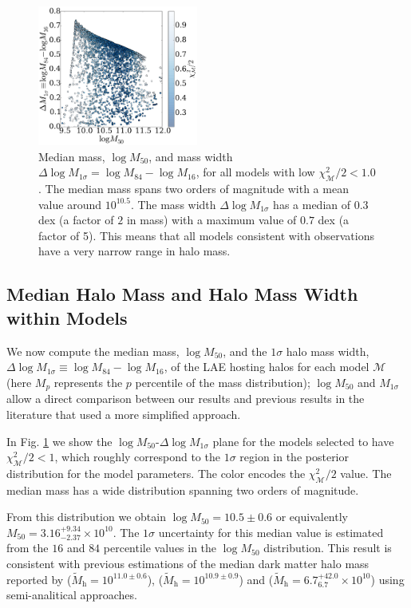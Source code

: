 \documentclass{emulateapj}
\newcommand{\hMsun}{{\ifmmode{h^{-1}{\rm {M_{\odot}}}}\else{$h^{-1}{\rm{M_{\odot}}}$}\fi}}
\begin{document}
\begin{figure}
\includegraphics[width=0.47\textwidth]{fig4.pdf}
\caption{Median mass, $\log M_{50}$, and mass width $\Delta \log
  M_{1\sigma}=\log M_{84} - \log M_{16}$, for all models with low
  $\chi^2_{\mathcal{M}}/2 < 1.0$. 
  The median mass spans two orders of magnitude with a mean value
  around $10^{10.5}$\hMsun.   
  The mass width $\Delta \log M_{1\sigma}$ has a median of $0.3$ dex (a factor
  of $2$ in mass) with a maximum value of $0.7$ dex (a factor of
  5). This means that all models consistent with observations have a
  very narrow range in halo mass.}
\label{fig:mmed}
\end{figure}

\subsection{Median Halo Mass and Halo Mass Width within Models}

We now compute the median mass, $\log M_{50}$, and the $1\sigma$ halo mass
width, $\Delta \log M_{1\sigma} \equiv \log M_{84} - \log M_{16}$, of the
LAE hosting halos for each model  $\mathcal{M}$ (here $M_{p}$
represents the $p$ percentile of the mass distribution); $\log M_{50}$
and $M_{1\sigma}$ allow a direct comparison between our results and
previous results in the literature
\citep[e.g.][]{Hayashino2004,Gawiser2007,Ouchi2010,Bielby16} that used
a more simplified approach. 

In Fig. \ref{fig:mmed} we show the $\log M_{50}$-$\Delta \log M_{1\sigma}$
plane for the models selected to have $\chi^{2}_{\mathcal{M}}/2 < 1$,
which roughly correspond to the $1\sigma$ region in the posterior
distribution for the model parameters. The color encodes the
$\chi^{2}_{\mathcal{M}}/2$ value. The median mass has a wide distribution
spanning two orders of magnitude.

From this distribution we obtain $\log M_{50} = 10.5\pm 0.6$ or
equivalently $M_{50} = 3.16^{+9.34}_{-2.37}\times 10^{10}$\hMsun.  
The $1\sigma$ uncertainty for this median value is estimated from the
$16$ and $84$ percentile values in the $\log M_{50}$ distribution.  
This result is consistent with previous
 estimations of  the  median dark matter halo mass reported by
 \citet{Bielby16} ($\tilde{M}_{\mathrm h} = 10^{11.0\pm0.6}$),
 \citet{Gawiser07} ($\tilde{M}_{\mathrm h} = 10^{10.9\pm0.9}$) and
 \citet{Ouchi2010} ($\tilde{M}_{\mathrm h} =
 6.7^{+42.0}_{6.7}\times10^{10}$) using semi-analitical approaches.   
\end{document}
